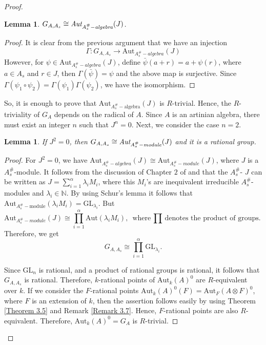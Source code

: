 \documentclass[12pt]{amsart}
\newtheorem{lemma}[theorem]{Lemma}
\theoremstyle{definition}
\numberwithin{equation}{section}
\begin{document}
\begin{proof}
\vskip4mm
\begin{lemma}\label{Lemma 4.24}
$G_{A,A_s}\cong \emph{\text{Aut}}_{A_s^{\#}-\textit{algebra}}(J)$.
\end{lemma}
 \vskip1mm
\begin{proof}
It is clear from the previous argument that we have an injection 
\begin{equation*}\label{eq13}
\Gamma: G_{A,A_s}\longrightarrow \text{Aut}_{A_s^{\#}-\textit{algebra}}(J)
\end{equation*}
However, for $\psi\in \text{Aut}_{A_s^{\#}-\textit{algebra}}(J)$,  define $\bar \psi(a+r)=a+\psi(r)$, where $a\in A_s$ and $r\in J$, then $\Gamma(\bar{\psi})=\psi$ and the above map is surjective. Since $\Gamma(\psi_1\circ\psi_2)=\Gamma(\psi_1)\Gamma(\psi_2)$, we have the isomorphism.
\end{proof}

\vskip2mm
\noindent
So, it is enough to prove that $\text{Aut}_{A_{s}^{\#}-\text{algebra}}(J)$ is $R$-trivial. Hence, the $R$-triviality of $G_A$ depends on the radical of $A$. Since $A$ is an artinian algebra, there must exist an integer $n$ such that $J^n=0$. Next, we consider the case $n=2$.

\vskip2mm
\begin{lemma}\label{Lemma 4.25}
If $J^2=0$, then $G_{A,A_s}\cong \emph{\text{Aut}}_{A_s^{\#}-\textit{module}}(J)$ and it is a rational group.
\end{lemma}
\vskip1mm
\begin{proof}
For $J^2=0$, we have $\text{Aut}_{A_{s}^{\#}-\textit{algebra}}(J)\cong \text{Aut}_{A_s^{\#}-\textit{module}}(J)$, where $J$ is a $A_s^{\#}$-module. It follows from the discussion of Chapter $2$ of \cite{Tifr} and \cite{Pierce} that the $A_s^{\#}$- $J$ can be written as 
$J=\sum_{i=1}^{\alpha} \lambda_{i}M_{i}$,
where this $M_i$'s are inequivalent irreducible $A_s^{\#}$-modules and $\lambda_i\in \mathbb{N}$. By using Schur's lemma it follows that $\text{Aut}_{A_s^{\#}-\text{module}}(\lambda_i M_i)=\text{GL}_{\lambda_i}$. But
\begin{equation*}\label{eq15}
\text{Aut}_{A_s^{\#}-\textit{module}}(J)\cong \prod_{i=1}^{\alpha}\text{Aut}(\lambda_{i}M_i), \text{ where $\prod$ denotes the product of groups. }
\end{equation*}
Therefore, we get \[G_{A,A_s}\cong \prod_{i=1}^{\alpha} \text{GL}_{\lambda_i}.\]

\vskip2mm
\noindent
Since $\text{GL}_n$ is rational, and a product of rational groups is rational, it follows that $G_{A, A_s}$ is rational. Therefore, $k$-rational points of $\text{Aut}_k(A)^{0}$ are $R$-equivalent over $k$. If we consider the $F$-rational points $\text{Aut}_k(A)^{0}(F)=\text{Aut}_F(A\otimes F)^{0}$, where $F$ is an extension of $k$, then the assertion follows easily by using Theorem \ref{Theorem 3.5} and Remark \ref{Remark 3.7}. Hence, $F$-rational points are also $R$-equivalent. Therefore, $\text{Aut}_k(A)^{0}=G_A$ is $R$-trivial.
\end{proof}


\end{proof}
\end{document}
